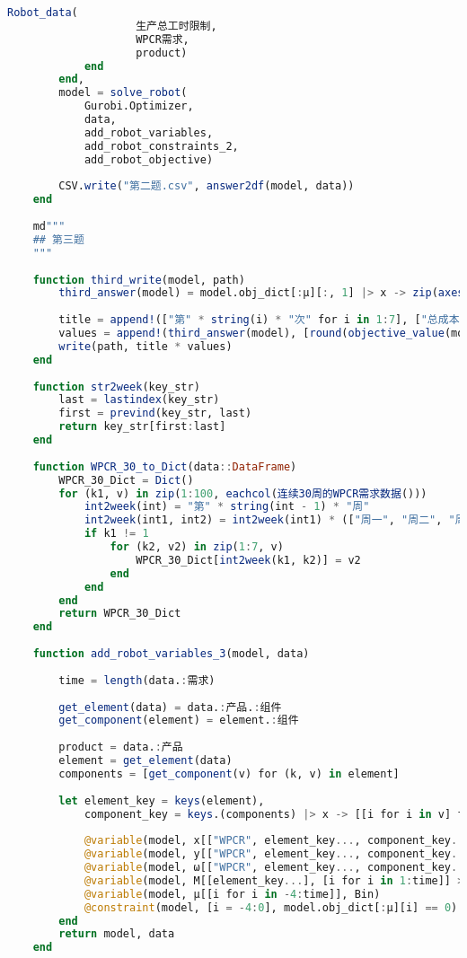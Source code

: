 \begin{appendices}
\begin{lstlisting}[language=julia]
                Robot_data(
                    生产总工时限制,
                    WPCR需求,
                    product)
            end
        end,
        model = solve_robot(
            Gurobi.Optimizer,
            data,
            add_robot_variables,
            add_robot_constraints_2,
            add_robot_objective)
    
        CSV.write("第二题.csv", answer2df(model, data))
    end
    
    md"""
    ## 第三题
    """
    
    function third_write(model, path)
        third_answer(model) = model.obj_dict[:μ][:, 1] |> x -> zip(axes(x)[1], Vector(value.(x))) |> collect |> x -> filter(x -> x[2] == 1, x) |> x -> map(x -> x[1], x)
    
        title = append!(["第" * string(i) * "次" for i in 1:7], ["总成本\n"]) |> x -> join(x, ", ")
        values = append!(third_answer(model), [round(objective_value(model))]) |> x -> join(x, ", ")
        write(path, title * values)
    end
    
    function str2week(key_str)
        last = lastindex(key_str)
        first = prevind(key_str, last)
        return key_str[first:last]
    end
    
    function WPCR_30_to_Dict(data::DataFrame)
        WPCR_30_Dict = Dict()
        for (k1, v) in zip(1:100, eachcol(连续30周的WPCR需求数据()))
            int2week(int) = "第" * string(int - 1) * "周"
            int2week(int1, int2) = int2week(int1) * (["周一", "周二", "周三", "周四", "周五", "周六", "周日"][int2])
            if k1 != 1
                for (k2, v2) in zip(1:7, v)
                    WPCR_30_Dict[int2week(k1, k2)] = v2
                end
            end
        end
        return WPCR_30_Dict
    end
    
    function add_robot_variables_3(model, data)
    
        time = length(data.:需求)
    
        get_element(data) = data.:产品.:组件
        get_component(element) = element.:组件
    
        product = data.:产品
        element = get_element(data)
        components = [get_component(v) for (k, v) in element]
    
        let element_key = keys(element),
            component_key = keys.(components) |> x -> [[i for i in v] for v in x] |> x -> vcat(x...)
    
            @variable(model, x[["WPCR", element_key..., component_key...], [i for i in 1:time]] >= 0, Int)
            @variable(model, y[["WPCR", element_key..., component_key...], [i for i in 1:time]] >= 0, Int)
            @variable(model, ω[["WPCR", element_key..., component_key...], [i for i in 1:time]], Bin)
            @variable(model, M[[element_key...], [i for i in 1:time]] >= 0, Int)
            @variable(model, μ[[i for i in -4:time]], Bin)
            @constraint(model, [i = -4:0], model.obj_dict[:μ][i] == 0)
        end
        return model, data
    end
    

\end{lstlisting}
\end{appendices}
